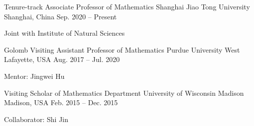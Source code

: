 

\begin{cventries}

  \cventry
    {Tenure-track Associate Professor of Mathematics} %
    {Shanghai Jiao Tong University} %
    {Shanghai, China} %
    {Sep. 2020 -- Present} %
    {
      \begin{cvitems} %
        \item {Joint with Institute of Natural Sciences}
      \end{cvitems}
    }


  \cventry
    {Golomb Visiting Assistant Professor of Mathematics} %
    {Purdue University} %
    {West Lafayette, USA} %
    {Aug. 2017 -- Jul. 2020} %
    {
      \begin{cvitems} %
        \item {Mentor: Jingwei Hu}
      \end{cvitems}
    }

  \cventry
    {Visiting Scholar of Mathematics Department} %
    {University of Wisconsin Madison} %
    {Madison, USA} %
    {Feb. 2015 -- Dec. 2015} %
    {
      \begin{cvitems} %
        \item {Collaborator: Shi Jin}
      \end{cvitems}
    }

\end{cventries}
